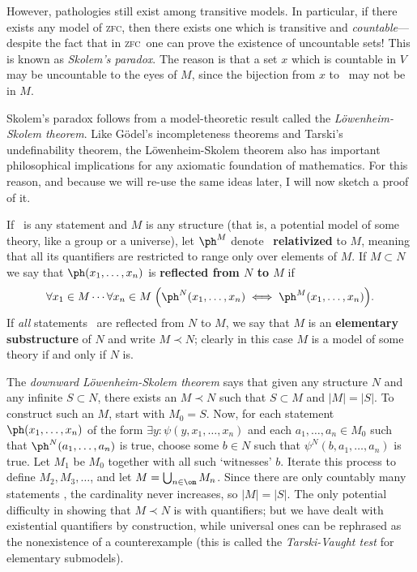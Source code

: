 \documentclass[12pt]{amsart}
\let\ee\prec
\def\zfc{\textsc{zfc}}
\begin{document}
However, pathologies still exist among transitive models.  In
particular, if there exists any model of \zfc, then there exists one
which is transitive and \emph{countable}---despite the fact that in
\zfc\ one can prove the existence of uncountable sets!  This is known
as \emph{Skolem's paradox}.  The reason is that a set $x$ which is
countable in $V$ may be uncountable to the eyes of $M$, since the
bijection from $x$ to \om\ may not be in $M$.

Skolem's paradox follows from a model-theoretic result called the
\emph{L\"owenheim-Skolem theorem}.  Like G\"odel's incompleteness
theorems and Tarski's undefinability theorem, the L\"owenheim-Skolem
theorem also has important philosophical implications for any
axiomatic foundation of mathematics.  For this reason, and because we
will re-use the same ideas later, I will now sketch a proof of it.

If \ph\ is any statement and $M$ is any structure (that is, a
potential model of some theory, like a group or a universe), let
$\ph^M$ denote \ph\ \textbf{relativized} to $M$, meaning that all its
quantifiers are restricted to range only over elements of $M$.  If
$M\subset N$ we say that $\ph(x_1,\dots,x_n)$ is \textbf{reflected
  from $N$ to $M$} if
\[\forall x_1\in M\cdots \forall x_n\in M \;\Big( \ph^N(x_1,\dots,x_n)
\iff \ph^M(x_1,\dots,x_n)\Big).
\]
If \emph{all} statements \ph\ are reflected from $N$ to $M$, we say
that $M$ is an \textbf{elementary substructure} of $N$ and write $M\ee
N$; clearly in this case $M$ is a model of some theory if and only if
$N$ is.

The \emph{downward L\"owenheim-Skolem theorem} says that given any
structure $N$ and any infinite $S\subset N$, there exists an $M\ee N$
such that $S\subset M$ and $|M| = |S|$.  To construct such an $M$,
start with $M_0=S$.  Now, for each statement $\ph(x_1,\dots,x_n)$ of
the form $\exists y: \psi(y,x_1,\dots,x_n)$ and each $a_1,\dots,a_n
\in M_0$ such that $\ph^N(a_1,\dots,a_n)$ is true, choose some $b\in
N$ such that $\psi^N(b,a_1,\dots,a_n)$ is true.  Let $M_1$ be $M_0$
together with all such `witnesses' $b$.  Iterate this process to
define $M_2,M_3,\dots$, and let $M=\bigcup_{n\in\om} M_n$.  Since
there are only countably many statements \ph, the cardinality never
increases, so $|M| = |S|$.  The only potential difficulty in showing
that $M\ee N$ is with quantifiers; but we have dealt with existential
quantifiers by construction, while universal ones can be rephrased as
the nonexistence of a counterexample (this is called the
\emph{Tarski-Vaught test} for elementary submodels).
\end{document}
